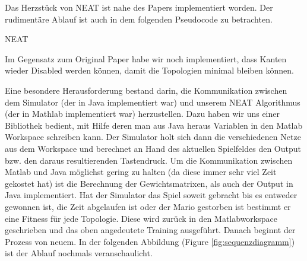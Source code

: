\documentclass{hbrs-ecta-report}
\begin{document}
Das Herzstück von NEAT ist nahe des Papers implementiert worden. Der rudimentäre Ablauf ist auch in dem folgenden Pseudocode zu betrachten.

\begin{algorithm}[h!]
\caption{NEAT}
\label{alg:heteroneat}
\begin{algorithmic}[1]

	\State $Parameter$: $\leftarrow$ defineSpecies($Parameter$)
	\State sort($fitness$)
	\State $Parameter$: $\leftarrow$ sharedFitness($Parameter$)
	\State $Parameter$: $\leftarrow$ defineBigSpecies($Parameter$)
	\State elitismInBigSpecies($Parameter$)
	\State $Parameter$: $\leftarrow$ defineOffspringFromSpecies($Parameter$)

	\For{species $s$ in $S$)
		\State $Parameter$: $\leftarrow$ crossover($s$,$randomSpecies$)
		\State $Parameter$: $\leftarrow$ mutate($s$) 
		
		/* mutateWeihts,add Node/Connection or Disable Connection*/
		\State $Parameter$: $\leftarrow$ appendRandomGenomes() 
		
			/* Until the population is full*/
		
	\EndFor

\EndFunction
\end{algorithmic}
\end{algorithm}

Im Gegensatz zum Original Paper habe wir noch implementiert, dass Kanten wieder Disabled werden können, damit die Topologien minimal bleiben können.

Eine besondere Herausforderung bestand darin, die Kommunikation zwischen dem Simulator (der in Java implementiert war) und unserem NEAT Algorithmus (der in Mathlab implementiert war) herzustellen. Dazu haben wir uns einer Bibliothek bedient, mit Hilfe deren man aus Java heraus Variablen in den Matlab Workspace schreiben kann. Der Simulator holt sich dann die verschiedenen Netze aus dem Workspace und berechnet an Hand des aktuellen Spielfeldes den Output bzw. den daraus resultierenden Tastendruck. Um die Kommunikation zwischen Matlab und Java möglichst gering zu halten (da diese immer sehr viel Zeit gekostet hat) ist die Berechnung der Gewichtsmatrixen, als auch der Output in Java implementiert. Hat der Simulator das Spiel soweit gebracht bis es entweder gewonnen ist, die Zeit abgelaufen ist oder der Mario gestorben ist bestimmt er eine Fitness für jede Topologie. Diese wird zurück in den Matlabworkspace geschrieben und das oben angedeutete Training ausgeführt. Danach beginnt der Prozess von neuem. In der folgenden Abbildung (Figure \ref{fig:sequenzdiagramm}) ist der Ablauf nochmals veranschaulicht.
\end{document}
